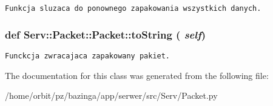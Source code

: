 \footnotesize\begin{verbatim}Funkcja sluzaca do ponownego zapakowania wszystkich danych.\end{verbatim}
\normalsize
 \hypertarget{class_serv_1_1_packet_1_1_packet_2738b48c8c177150338082c936c823dc}{
\subsubsection[{toString}]{\setlength{\rightskip}{0pt plus 5cm}def Serv::Packet::Packet::toString ( {\em self})}}
\label{class_serv_1_1_packet_1_1_packet_2738b48c8c177150338082c936c823dc}




\footnotesize\begin{verbatim}Funckcja zwracajaca zapakowany pakiet.\end{verbatim}
\normalsize
 

The documentation for this class was generated from the following file:\begin{CompactItemize}
\item 
/home/orbit/pz/bazinga/app/serwer/src/Serv/Packet.py\end{CompactItemize}
